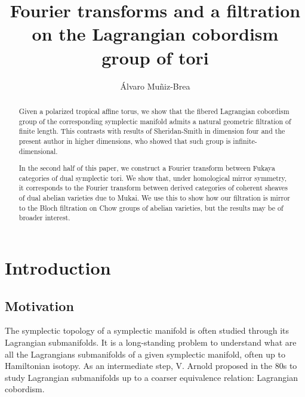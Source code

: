 \documentclass[10pt]{amsart}
\title[Fourier transforms and a filtration on the cobordism group of tori]{Fourier transforms and a filtration on the Lagrangian cobordism group of tori}
\author{Álvaro Muñiz-Brea}
\date{}
\theoremstyle{definition}
\theoremstyle{remark}
\begin{document}
\maketitle

\begin{abstract}
    Given a polarized tropical affine torus, we show that the fibered Lagrangian cobordism group of the corresponding symplectic manifold admits a natural geometric filtration of finite length.
    This contrasts with results of Sheridan-Smith in dimension four and the present author in higher dimensions, who showed that such group is infinite-dimensional.

    In the second half of this paper, we construct a Fourier transform between Fukaya categories of dual symplectic tori.  
    We show that, under homological mirror symmetry, it corresponds to the Fourier transform between derived categories of coherent sheaves of dual abelian varieties due to Mukai.
    We use this to show how our filtration is mirror to the Bloch filtration on Chow groups of abelian varieties, but the results may be of broader interest.
\end{abstract}

\tableofcontents

\section{Introduction}
\subsection{Motivation}\label{sec:motivation}
The symplectic topology of a symplectic manifold is often studied through its Lagrangian submanifolds.
It is a long-standing problem to understand what are all the Lagrangians submanifolds of a given symplectic manifold, often up to Hamiltonian isotopy.
As an intermediate step, V. Arnold proposed in the 80s to study Lagrangian submanifolds up to a coarser equivalence relation: Lagrangian cobordism.
\end{document}
